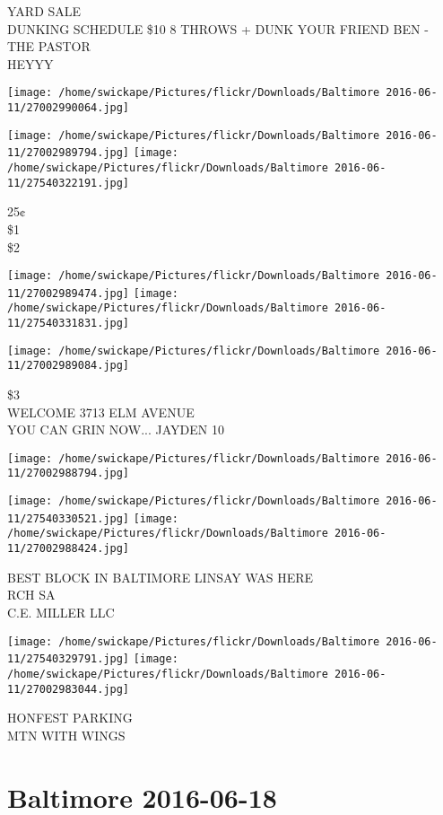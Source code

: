\documentclass[10pt,letterpaper]{article}
\begin{document}
YARD SALE\\
DUNKING SCHEDULE \$10 8 THROWS + DUNK YOUR FRIEND BEN {-} THE PASTOR\\
HEYYY
\pagebreak

\texttt{[image: /home/swickape/Pictures/flickr/Downloads/Baltimore 2016-06-11/27002990064.jpg]}

\vspace{0.25in}
\texttt{[image: /home/swickape/Pictures/flickr/Downloads/Baltimore 2016-06-11/27002989794.jpg]}
\texttt{[image: /home/swickape/Pictures/flickr/Downloads/Baltimore 2016-06-11/27540322191.jpg]}

25¢\\
\$1\\
\$2
\pagebreak

\texttt{[image: /home/swickape/Pictures/flickr/Downloads/Baltimore 2016-06-11/27002989474.jpg]}
\texttt{[image: /home/swickape/Pictures/flickr/Downloads/Baltimore 2016-06-11/27540331831.jpg]}

\vspace{0.25in}
\texttt{[image: /home/swickape/Pictures/flickr/Downloads/Baltimore 2016-06-11/27002989084.jpg]}

\$3\\
WELCOME 3713 ELM AVENUE\\
YOU CAN GRIN NOW... JAYDEN 10
\pagebreak

\texttt{[image: /home/swickape/Pictures/flickr/Downloads/Baltimore 2016-06-11/27002988794.jpg]}

\vspace{0.25in}
\texttt{[image: /home/swickape/Pictures/flickr/Downloads/Baltimore 2016-06-11/27540330521.jpg]}
\texttt{[image: /home/swickape/Pictures/flickr/Downloads/Baltimore 2016-06-11/27002988424.jpg]}

BEST BLOCK IN BALTIMORE LINSAY WAS HERE\\
RCH SA\\
C.E. MILLER LLC
\pagebreak

\texttt{[image: /home/swickape/Pictures/flickr/Downloads/Baltimore 2016-06-11/27540329791.jpg]}
\texttt{[image: /home/swickape/Pictures/flickr/Downloads/Baltimore 2016-06-11/27002983044.jpg]}

HONFEST PARKING\\
MTN WITH WINGS
\pagebreak

\section*{Baltimore 2016-06-18}
\end{document}
